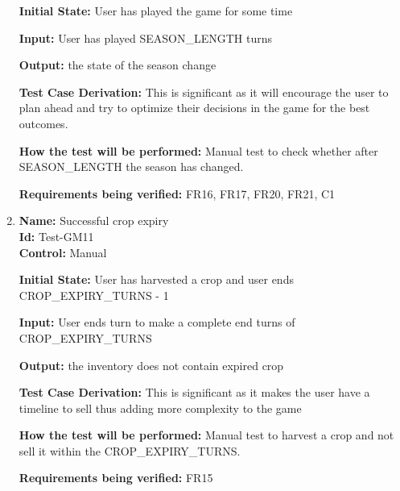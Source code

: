 \documentclass[12pt, titlepage]{article}
\begin{document}
\begin{enumerate}
\textbf{Initial State:} User has played the game for some time

\textbf{Input:} User has played SEASON\_LENGTH turns

\textbf{Output:} the state of the season change

\textbf{Test Case Derivation:} This is significant as it will encourage the user to plan ahead and try to optimize their decisions in the game for the best outcomes.

\textbf{How the test will be performed:} Manual test to check whether after SEASON\_LENGTH the season has changed.

\textbf{Requirements being verified:}  FR16, FR17, FR20, FR21, C1

\item{\textbf{Name:} Successful crop expiry\\} %
\textbf{Id:} Test-GM11 \label{Test-GM11}\\

\textbf{Control:} Manual

\textbf{Initial State:} User has harvested a crop and user ends CROP\_EXPIRY\_TURNS - 1

\textbf{Input:} User ends turn to make a complete end turns of CROP\_EXPIRY\_TURNS

\textbf{Output:} the inventory does not contain expired crop

\textbf{Test Case Derivation:} This is significant as it makes the user have a timeline to sell thus adding more complexity to the game

\textbf{How the test will be performed:} Manual test to harvest a crop and not sell it within the CROP\_EXPIRY\_TURNS.

\textbf{Requirements being verified:}  FR15

\end{enumerate}
\end{document}
